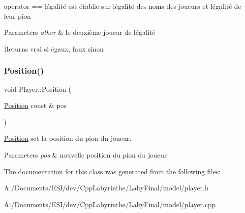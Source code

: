operator == l\textquotesingle{}égalité est établie sur l\textquotesingle{}égalité des noms des joueurs et l\textquotesingle{}égalité de leur pion 


\begin{DoxyParams}{Parameters}
{\em other} & le deuxième joueur de l\textquotesingle{}égalité \\
\hline
\end{DoxyParams}
\begin{DoxyReturn}{Returns}
vrai si égaux, faux sinon 
\end{DoxyReturn}
\mbox{\label{class_player_ae7ee566ede118cfe993fd404a3bdca27}} 
\subsubsection{\texorpdfstring{Position()}{Position()}}
{\footnotesize\ttfamily void Player\+::\+Position (\begin{DoxyParamCaption}\item[{\mbox{\hyperlink{class_position}{Position}} const \&}]{pos }\end{DoxyParamCaption})\hspace{0.3cm}{\ttfamily [inline]}}



\mbox{\hyperlink{class_position}{Position}} set la position du pion du joueur. 


\begin{DoxyParams}{Parameters}
{\em pos} & nouvelle position du pion du joueur \\
\hline
\end{DoxyParams}


The documentation for this class was generated from the following files\+:\begin{DoxyCompactItemize}
\item 
A\+:/\+Documents/\+E\+S\+I/dev/\+Cpp\+Labyrinthe/\+Laby\+Final/model/player.\+h\item 
A\+:/\+Documents/\+E\+S\+I/dev/\+Cpp\+Labyrinthe/\+Laby\+Final/model/player.\+cpp\end{DoxyCompactItemize}
